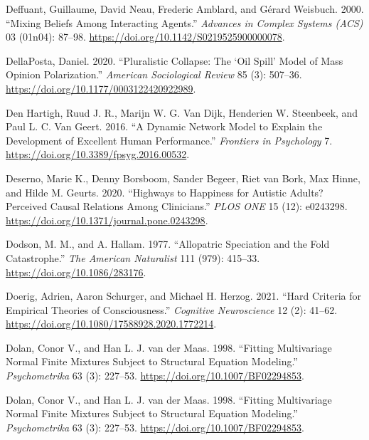 \documentclass[
  a4paper,
  DIV=11,
  numbers=noendperiod,
  oneside]{scrreprt}
\newlength{\cslhangindent}
\newlength{\cslentryspacingunit} %
\newenvironment{CSLReferences}[2] %
 {%
  \setlength{\parindent}{0pt}
  \ifodd #1
  \let\oldpar\par
  \def\par{\hangindent=\cslhangindent\oldpar}
  \fi
  \setlength{\parskip}{#2\cslentryspacingunit}
 }%
 {}
\begin{document}
\begin{CSLReferences}{1}{0}
\leavevmode{}%
Deffuant, Guillaume, David Neau, Frederic Amblard, and Gérard Weisbuch.
2000. {``Mixing Beliefs Among Interacting Agents.''} \emph{Advances in
Complex Systems (ACS)} 03 (01n04): 87--98.
\url{https://doi.org/10.1142/S0219525900000078}.

\leavevmode{}%
DellaPosta, Daniel. 2020. {``Pluralistic {Collapse}: {The} {`{Oil
Spill}'} {Model} of {Mass Opinion Polarization}.''} \emph{American
Sociological Review} 85 (3): 507--36.
\url{https://doi.org/10.1177/0003122420922989}.

\leavevmode{}%
Den Hartigh, Ruud J. R., Marijn W. G. Van Dijk, Henderien W. Steenbeek,
and Paul L. C. Van Geert. 2016. {``A {Dynamic Network Model} to
{Explain} the {Development} of {Excellent Human Performance}.''}
\emph{Frontiers in Psychology} 7.
\url{https://doi.org/10.3389/fpsyg.2016.00532}.

\leavevmode{}%
Deserno, Marie K., Denny Borsboom, Sander Begeer, Riet van Bork, Max
Hinne, and Hilde M. Geurts. 2020. {``Highways to Happiness for Autistic
Adults? {Perceived} Causal Relations Among Clinicians.''} \emph{PLOS
ONE} 15 (12): e0243298.
\url{https://doi.org/10.1371/journal.pone.0243298}.

\leavevmode{}%
Dodson, M. M., and A. Hallam. 1977. {``Allopatric {Speciation} and the
{Fold Catastrophe}.''} \emph{The American Naturalist} 111 (979):
415--33. \url{https://doi.org/10.1086/283176}.

\leavevmode{}%
Doerig, Adrien, Aaron Schurger, and Michael H. Herzog. 2021. {``Hard
Criteria for Empirical Theories of Consciousness.''} \emph{Cognitive
Neuroscience} 12 (2): 41--62.
\url{https://doi.org/10.1080/17588928.2020.1772214}.

\leavevmode{}%
Dolan, Conor V., and Han L. J. van der Maas. 1998. {``Fitting
Multivariage Normal Finite Mixtures Subject to Structural Equation
Modeling.''} \emph{Psychometrika} 63 (3): 227--53.
\url{https://doi.org/10.1007/BF02294853}.

\leavevmode{}%
Dolan, Conor V., and Han L. J. van der Maas. 1998. {``Fitting
Multivariage Normal Finite Mixtures Subject to Structural Equation
Modeling.''} \emph{Psychometrika} 63 (3): 227--53.
\url{https://doi.org/10.1007/BF02294853}.


\end{CSLReferences}
\end{document}
